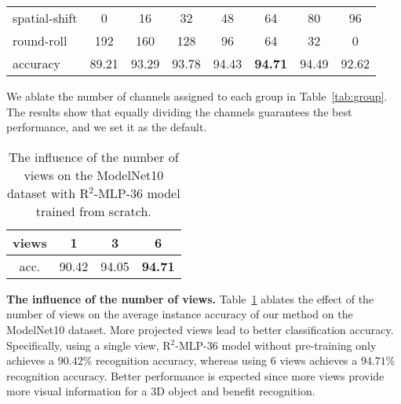 \documentclass[11pt]{article}
\begin{document}
\begin{table*}[h]

\vspace{0.2in}

\caption{
Ablation on R$^2$-MLP block's group splitting. We assign four groups for spatial-shift and two groups for round-roll.
The channel $c$ is 384 in total.
The first row is for each spatial-shift group, and the second is for each round-roll group. Equally divided is the best.
}
\label{tab:group}
\centering
\begin{tabular}{lccccccc}
\toprule
 spatial-shift & 0 & 16 & 32 & 48 & 64 & 80 & 96 \\
 round-roll & 192 & 160 & 128 & 96 & 64 & 32 & 0 \\
 \midrule
 accuracy & 89.21 & 93.29 & 93.78 & 94.43 & \textbf{94.71} & 94.49 & 92.62 \\
\bottomrule
\end{tabular}\vspace{0.2in}
\end{table*}

We ablate the number of channels assigned to each group in Table~\ref{tab:group}. The results show that equally dividing the channels guarantees the best performance, and we set it as the default.

\newpage

\begin{table}[h]
\caption{The influence of the number of views on the ModelNet10 dataset with R$^2$-MLP-36 model trained from scratch.}
\label{tab:view}
\centering
\begin{tabular}{cccc}
\toprule
views & 1 & 3 & 6 \\
\midrule
acc. & 90.42 & 94.05 & \textbf{94.71} \\
\bottomrule
\end{tabular}
\end{table}



\vspace{0.2in}\noindent\textbf{The influence of the number of views.} Table~\ref{tab:view} ablates the effect of the number of views on the average instance accuracy of our method on the ModelNet10 dataset. More projected views lead to better classification accuracy. Specifically, using a single view, R$^2$-MLP-36 model without pre-training only achieves a $90.42\%$ recognition accuracy, whereas using 6 views achieves a $94.71\%$ recognition accuracy. Better performance is expected since more views provide more visual information for a 3D object and benefit recognition.
\end{document}
